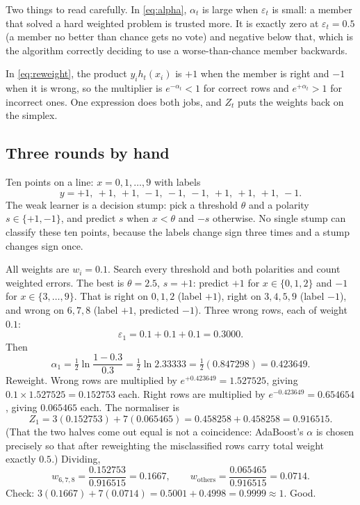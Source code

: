 \documentclass[11pt]{article}
\begin{document}
Two things to read carefully. In \eqref{eq:alpha}, $\alpha_t$ is large when
$\varepsilon_t$ is small: a member that solved a hard weighted problem is
trusted more. It is exactly zero at $\varepsilon_t = 0.5$ (a member no better
than chance gets no vote) and negative below that, which is the algorithm
correctly deciding to use a worse-than-chance member backwards.

In \eqref{eq:reweight}, the product $y_i h_t(x_i)$ is $+1$ when the member is
right and $-1$ when it is wrong, so the multiplier is $e^{-\alpha_t} < 1$ for
correct rows and $e^{+\alpha_t} > 1$ for incorrect ones. One expression does
both jobs, and $Z_t$ puts the weights back on the simplex.

\subsection{Three rounds by hand}
\label{sec:adahand}

Ten points on a line: $x = 0, 1, \dots, 9$ with labels
\[
  y = +1,\ +1,\ +1,\ -1,\ -1,\ -1,\ +1,\ +1,\ +1,\ -1.
\]
The weak learner is a decision stump: pick a threshold $\theta$ and a polarity
$s \in \{+1, -1\}$, and predict $s$ when $x < \theta$ and $-s$ otherwise. No
single stump can classify these ten points, because the labels change sign
three times and a stump changes sign once.

\begin{worked}[Round 1]
All weights are $w_i = 0.1$. Search every threshold and both polarities and
count weighted errors. The best is $\theta = 2.5$, $s = +1$: predict $+1$ for
$x \in \{0,1,2\}$ and $-1$ for $x \in \{3,\dots,9\}$. That is right on
$0,1,2$ (label $+1$), right on $3,4,5,9$ (label $-1$), and wrong on
$6,7,8$ (label $+1$, predicted $-1$). Three wrong rows, each of weight $0.1$:
\[
  \varepsilon_1 = 0.1 + 0.1 + 0.1 = \mathbf{0.3000}.
\]
Then
\[
  \alpha_1 = \tfrac12 \ln\frac{1 - 0.3}{0.3}
           = \tfrac12 \ln 2.33333
           = \tfrac12 (0.847298)
           = \mathbf{0.423649}.
\]
Reweight. Wrong rows are multiplied by $e^{+0.423649} = 1.527525$, giving
$0.1 \times 1.527525 = 0.152753$ each. Right rows are multiplied by
$e^{-0.423649} = 0.654654$, giving $0.065465$ each. The normaliser is
\[
  Z_1 = 3(0.152753) + 7(0.065465) = 0.458258 + 0.458258 = 0.916515.
\]
(That the two halves come out equal is not a coincidence: AdaBoost's $\alpha$
is chosen precisely so that after reweighting the misclassified rows carry
total weight exactly $0.5$.) Dividing,
\[
  w_{6,7,8} = \frac{0.152753}{0.916515} = \mathbf{0.1667},
  \qquad
  w_{\text{others}} = \frac{0.065465}{0.916515} = \mathbf{0.0714}.
\]
Check: $3(0.1667) + 7(0.0714) = 0.5001 + 0.4998 = 0.9999 \approx 1$. Good.
\end{worked}
\end{document}
